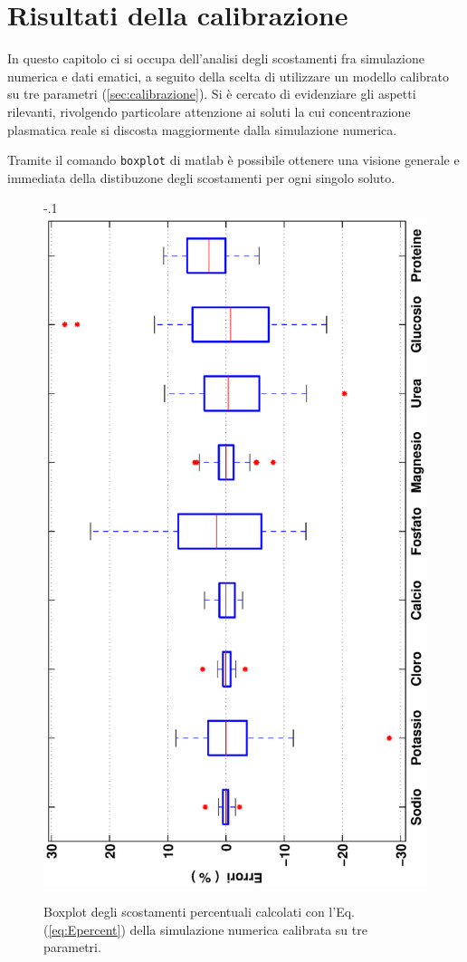 \chapter{Risultati della calibrazione}
In questo capitolo ci si occupa dell'analisi degli scostamenti fra simulazione numerica e dati ematici, a seguito della scelta di utilizzare un modello calibrato su tre parametri (\textsection\ref{sec:calibrazione}). Si è cercato di evidenziare gli aspetti rilevanti, rivolgendo particolare attenzione ai soluti la cui concentrazione plasmatica reale si discosta maggiormente dalla simulazione numerica.

Tramite il comando \verb|boxplot| di matlab è possibile ottenere una visione generale e immediata della distibuzone degli scostamenti per ogni singolo soluto.
\begin{figure}[htb]
	\centering
	\advance\leftskip-.1\textwidth
		\includegraphics[angle=-90, width=1.2\textwidth]{immagini/boxplot_calibrazione.eps}
		\caption{Boxplot degli scostamenti percentuali calcolati con l'Eq.(\ref{eq:Epercent}) della simulazione numerica calibrata su tre parametri.}
		\label{fig:boxplot}
\end{figure}

